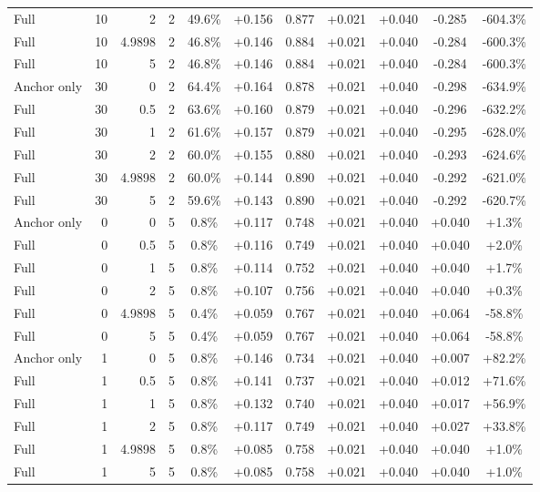 \begin{table}[htbp]
\begin{tabular}{lrrrccccccc}
Full & 10 & 2 & 2 & 49.6\% & +0.156 & 0.877 & +0.021 & +0.040 & -0.285 & -604.3\% \\
Full & 10 & 4.9898 & 2 & 46.8\% & +0.146 & 0.884 & +0.021 & +0.040 & -0.284 & -600.3\% \\
Full & 10 & 5 & 2 & 46.8\% & +0.146 & 0.884 & +0.021 & +0.040 & -0.284 & -600.3\% \\
Anchor only & 30 & 0 & 2 & 64.4\% & +0.164 & 0.878 & +0.021 & +0.040 & -0.298 & -634.9\% \\
Full & 30 & 0.5 & 2 & 63.6\% & +0.160 & 0.879 & +0.021 & +0.040 & -0.296 & -632.2\% \\
Full & 30 & 1 & 2 & 61.6\% & +0.157 & 0.879 & +0.021 & +0.040 & -0.295 & -628.0\% \\
Full & 30 & 2 & 2 & 60.0\% & +0.155 & 0.880 & +0.021 & +0.040 & -0.293 & -624.6\% \\
Full & 30 & 4.9898 & 2 & 60.0\% & +0.144 & 0.890 & +0.021 & +0.040 & -0.292 & -621.0\% \\
Full & 30 & 5 & 2 & 59.6\% & +0.143 & 0.890 & +0.021 & +0.040 & -0.292 & -620.7\% \\
Anchor only & 0 & 0 & 5 & 0.8\% & +0.117 & 0.748 & +0.021 & +0.040 & +0.040 & +1.3\% \\
Full & 0 & 0.5 & 5 & 0.8\% & +0.116 & 0.749 & +0.021 & +0.040 & +0.040 & +2.0\% \\
Full & 0 & 1 & 5 & 0.8\% & +0.114 & 0.752 & +0.021 & +0.040 & +0.040 & +1.7\% \\
Full & 0 & 2 & 5 & 0.8\% & +0.107 & 0.756 & +0.021 & +0.040 & +0.040 & +0.3\% \\
Full & 0 & 4.9898 & 5 & 0.4\% & +0.059 & 0.767 & +0.021 & +0.040 & +0.064 & -58.8\% \\
Full & 0 & 5 & 5 & 0.4\% & +0.059 & 0.767 & +0.021 & +0.040 & +0.064 & -58.8\% \\
Anchor only & 1 & 0 & 5 & 0.8\% & +0.146 & 0.734 & +0.021 & +0.040 & +0.007 & +82.2\% \\
Full & 1 & 0.5 & 5 & 0.8\% & +0.141 & 0.737 & +0.021 & +0.040 & +0.012 & +71.6\% \\
Full & 1 & 1 & 5 & 0.8\% & +0.132 & 0.740 & +0.021 & +0.040 & +0.017 & +56.9\% \\
Full & 1 & 2 & 5 & 0.8\% & +0.117 & 0.749 & +0.021 & +0.040 & +0.027 & +33.8\% \\
Full & 1 & 4.9898 & 5 & 0.8\% & +0.085 & 0.758 & +0.021 & +0.040 & +0.040 & +1.0\% \\
Full & 1 & 5 & 5 & 0.8\% & +0.085 & 0.758 & +0.021 & +0.040 & +0.040 & +1.0\% \\

\end{tabular}
\end{table}

